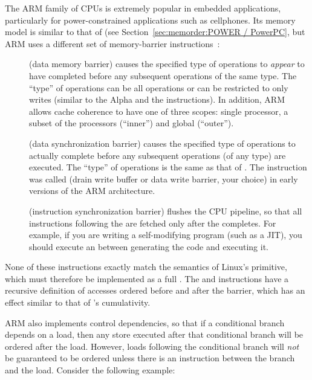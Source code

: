 The ARM family of CPUs is extremely popular in embedded applications,
particularly for power-constrained applications such as cellphones.
Its memory model is similar to that of \Power{}
(see Section~\ref{sec:memorder:POWER / PowerPC}, but ARM uses a
different set of memory-barrier instructions~\cite{ARMv7A:2010}:

\begin{description}
\item	[] (data memory barrier) causes the specified type of
	operations to \emph{appear} to have completed before any
	subsequent operations of the same type.
	The ``type'' of operations can be all operations or can be
	restricted to only writes (similar to the Alpha 
	and the \Power{}  instructions).
	In addition, ARM allows cache coherence to have one of three
	scopes: single processor, a subset of the processors
	(``inner'') and global (``outer'').
\item	[] (data synchronization barrier) causes the specified
	type of operations to actually complete before any subsequent
	operations (of any type) are executed.
	The ``type'' of operations is the same as that of .
	The  instruction was called  (drain write buffer
	or data write barrier, your choice) in early versions of the
	ARM architecture.
\item	[] (instruction synchronization barrier) flushes the CPU
	pipeline, so that all instructions following the 
	are fetched only after the  completes.
	For example, if you are writing a self-modifying program
	(such as a JIT), you should execute an  between
	generating the code and executing it.
\end{description}

None of these instructions exactly match the semantics of Linux's
 primitive, which must therefore be implemented as a full
.
The  and  instructions have a recursive definition
of accesses ordered before and after the barrier, which has an effect
similar to that of \Power{}'s cumulativity.

ARM also implements control dependencies, so that if a conditional
branch depends on a load, then any store executed after that conditional
branch will be ordered after the load.
However, loads following the conditional branch will \emph{not}
be guaranteed to be ordered unless there is an 
instruction between the branch and the load.
Consider the following example:

